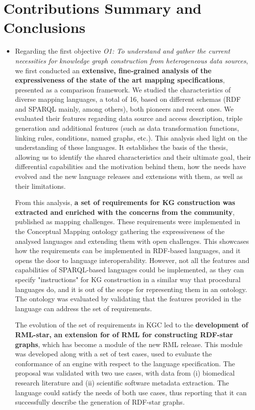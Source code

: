 \section{Contributions Summary and Conclusions}
\label{sec:chp7_summary}
\begin{itemize}
    \item Regarding the first objective \textit{O1: To understand and gather the current necessities for knowledge graph construction from heterogeneous data sources}, we first conducted an \textbf{extensive, fine-grained analysis of the expressiveness of the state of the art mapping specifications}, presented as a comparison framework. 
    We studied the characteristics of diverse mapping languages, a total of 16, based on different schemas (RDF and SPARQL mainly, among others), both pioneers and recent ones. 
    We evaluated their features regarding data source and access description, triple generation and additional features (such as data transformation functions, linking rules, conditions, named graphs, etc.). 
    This analysis shed light on the understanding of these languages. It establishes the basis of the thesis, allowing us to identify the shared characteristics and their ultimate goal, their differential capabilities and the motivation behind them, how the needs have evolved and the new language releases and extensions with them, as well as their limitations.
    
    From this analysis, \textbf{a set of requirements for KG construction was extracted and enriched with the concerns from the community}, published as mapping challenges. 
    These requirements were implemented in the Conceptual Mapping ontology gathering the expressiveness of the analysed languages and extending them with open challenges. This showcases how the requirements can be implemented in RDF-based languages, and it opens the door to language interoperability. 
    However, not all the features and capabilities of SPARQL-based languages could be implemented, as they can specify "instructions" for KG construction in a similar way that procedural languages do, and it is out of the scope for representing them in an ontology. 
    The ontology was evaluated by validating that the features provided in the language can address the set of requirements. 
    
    The evolution of the set of requirements in KGC led to the \textbf{development of RML-star, an extension for of RML for constructing RDF-star graphs}, which has become a module of the new RML release. 
    This module was developed along with a set of test cases, used to evaluate the conformance of an engine with respect to the language specification. 
    The proposal was validated with two use cases, with data from (i) biomedical research literature and (ii) scientific software metadata extraction. 
    The language could satisfy the needs of both use cases, thus reporting that it can successfully describe the generation of RDF-star graphs. 
    

\end{itemize}
